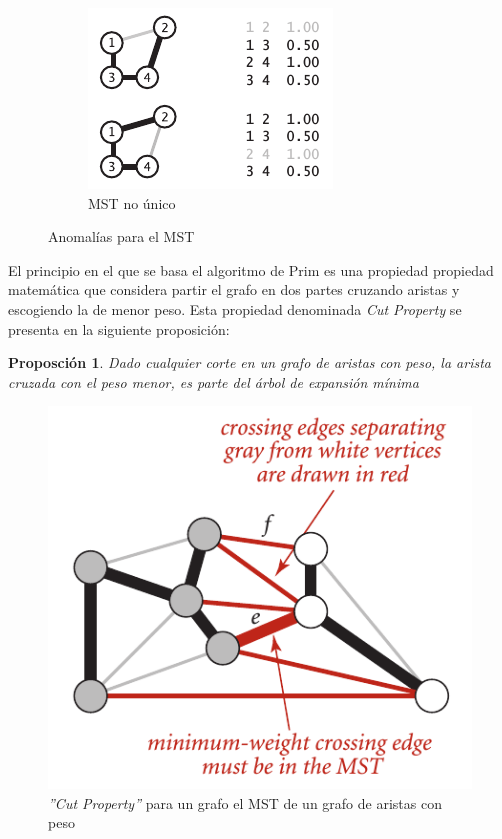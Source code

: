 \documentclass[letterpaper]{article}
\newtheorem{prop}{Proposción}
\begin{document}
\begin{figure}[h]
\begin{subfigure}[b]{0.3\textwidth}
                \includegraphics[width=\textwidth]{Images/conve3.png}
                \caption{MST no único}
                \label{fig:conve3}
        \end{subfigure}
        \caption{Anomalías para el MST}\label{fig:conve}
\end{figure}

El principio en el que se basa el algoritmo de Prim es una propiedad propiedad matemática que considera partir el grafo en dos partes cruzando aristas y escogiendo la de menor peso. Esta propiedad denominada \textit{Cut Property} se presenta en la siguiente proposición:

\begin{prop}
Dado cualquier corte en un grafo de aristas con peso, la arista cruzada con el peso menor, es parte del árbol de expansión mínima
\end{prop}

\begin{figure}	
\includegraphics[width=.35\textwidth]{Images/CutProp.png}
\centering
\caption{\textit{''Cut Property''} para un grafo el MST de un grafo de aristas con peso}
\label{fig:MSTree}
\end{figure}
\end{document}
